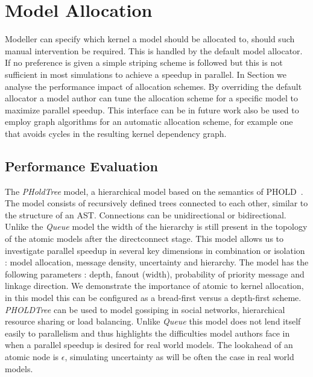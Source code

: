 \section{Model Allocation}
Modeller can specify which kernel a model should be allocated to, should such manual intervention be required. This is handled by the default model allocator. If no preference is given a simple striping scheme is followed but this is not sufficient in most simulations to achieve a speedup in parallel. In Section  we analyse the performance impact of allocation schemes. By overriding the default allocator a model author can tune the allocation scheme for a specific model to maximize parallel speedup. This interface can be in future work also be used to employ graph algorithms for an automatic allocation scheme, for example one that avoids cycles in the resulting kernel dependency graph.

\subsection{Performance Evaluation}

The \textit{PHoldTree} model, a hierarchical model based on the semantics of PHOLD~\cite{PHOLD}. The model consists of recursively defined trees connected to each other, similar to the structure of an AST. Connections can be unidirectional or bidirectional.
Unlike the \textit{Queue} model the width of the hierarchy is still present in the topology of the atomic models after the directconnect stage. This model allows us to investigate parallel speedup in several key dimensions in combination or isolation : model allocation, message density, uncertainty and hierarchy. The model has the following parameters : depth, fanout (width), probability of priority message and linkage direction. We demonstrate the importance of atomic to kernel allocation, in this model this can be configured as a bread-first versus a depth-first scheme.
\textit{PHOLDTree} can be used to model gossiping in social networks, hierarchical resource sharing or load balancing. Unlike \textit{Queue} this model does not lend itself easily to parallelism and thus highlights the difficulties model authors face in when a parallel speedup is desired for real world models.
The lookahead of an atomic node is $\epsilon$, simulating uncertainty as will be often the case in real world models.

